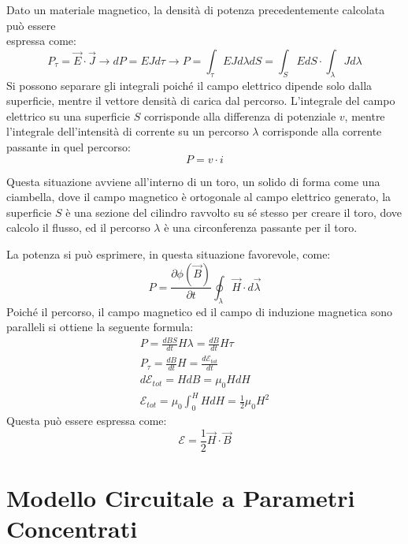 \documentclass{article}
\numberwithin{equation}{subsection}
\begin{document}
Dato un materiale magnetico, la densità di potenza precedentemente calcolata può essere\\espressa come:
\begin{equation*}
    P_\tau=\vec{E}\cdot\vec{J}\to dP=EJd\tau\to P=\displaystyle\int_{\tau}EJd\lambda dS=\int_{S}EdS\cdot\int_{\lambda}Jd\lambda
\end{equation*}
Si possono separare gli integrali poiché il campo elettrico dipende solo dalla superficie, mentre il vettore densità di carica dal percorso. L'integrale del campo elettrico 
su una superficie $S$ corrisponde alla differenza di potenziale $v$, mentre l'integrale dell'intensità di corrente su un percorso $\lambda$ corrisponde alla corrente passante 
in quel percorso: 
\begin{equation}
    P=v\cdot i
\end{equation}

Questa situazione avviene all'interno di un toro, un solido di forma come una ciambella, dove il campo magnetico è ortogonale al campo elettrico generato, la superficie $S$ 
è una sezione del cilindro ravvolto su sé stesso per creare il toro, dove calcolo il flusso, ed il percorso $\lambda$ è una circonferenza passante per il toro. 

La potenza si può esprimere, in questa situazione favorevole, come:
\begin{equation*}
    P=\displaystyle\frac{\partial \phi(\vec{B})}{\partial t}\oint_{\lambda}\vec{H}\cdot d\vec{\lambda}
\end{equation*}
Poiché il percorso, il campo magnetico ed il campo di induzione magnetica sono paralleli si ottiene la seguente formula:
\begin{gather*}
    P=\displaystyle\frac{dBS}{dt}H\lambda=\frac{dB}{dt}H\tau\\
    P_{\tau}=\displaystyle\frac{dB}{dt}H=\frac{d\mathscr{E}_{tot}}{dt}\\
    d\mathscr{E}_{tot}=HdB=\mu_0HdH\\
    \mathscr{E}_{tot}=\displaystyle\mu_0\int_0^HHdH=\frac{1}{2}\mu_0H^2
\end{gather*}
Questa può essere espressa come:
\begin{equation}
    \mathscr{E}=\displaystyle\frac{1}{2}\vec{H}\cdot\vec{B}
\end{equation}

\clearpage

\section{Modello Circuitale a Parametri Concentrati}
\end{document}
